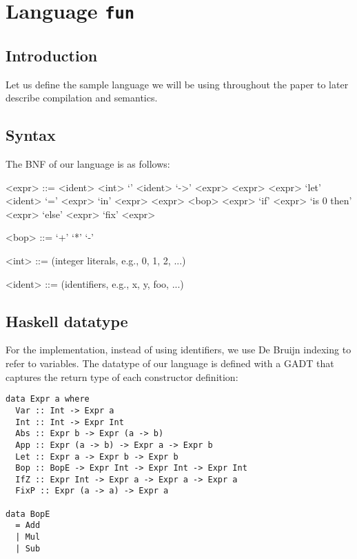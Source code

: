 \section{Language \texttt{fun}}
\subsection{Introduction}
Let us define the sample language we will be using throughout the paper to later describe compilation and semantics.
\subsection{Syntax}
The BNF of our language is as follows:

\begin{grammar}

<expr> ::= <ident>
\alt <int>
\alt `\lambda' <ident> `->' <expr>
\alt <expr> <expr>
\alt `let' <ident> `=' <expr> `in' <expr>
\alt <expr> <bop> <expr>
\alt `if' <expr> `is 0 then' <expr> `else' <expr>
\alt `fix' <expr>

<bop> ::= `+'
\alt `*'
\alt `-'

<int> ::= (integer literals, e.g., 0, 1, 2, ...)

<ident> ::= (identifiers, e.g., x, y, foo, ...)

\end{grammar}

\subsection{Haskell datatype}
For the implementation, instead of using identifiers, we use De Bruijn indexing to refer to variables.
The datatype of our language is defined with a GADT that captures the return type
of each constructor definition:

\begin{lstlisting}
data Expr a where
  Var :: Int -> Expr a
  Int :: Int -> Expr Int
  Abs :: Expr b -> Expr (a -> b)
  App :: Expr (a -> b) -> Expr a -> Expr b
  Let :: Expr a -> Expr b -> Expr b
  Bop :: BopE -> Expr Int -> Expr Int -> Expr Int
  IfZ :: Expr Int -> Expr a -> Expr a -> Expr a
  FixP :: Expr (a -> a) -> Expr a

data BopE
  = Add
  | Mul
  | Sub
\end{lstlisting}

